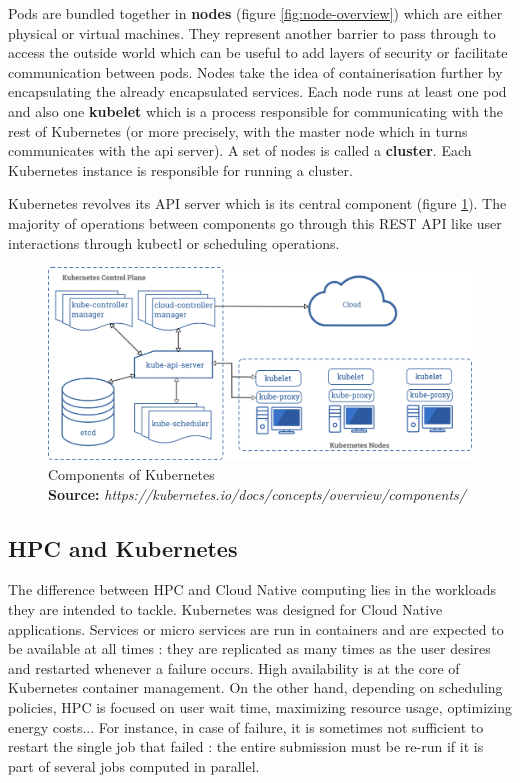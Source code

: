 \documentclass[12pt, a4paper]{memoir}
\newcommand*{\captionsource}[2]{%
    \caption[{#1}]{%
        #1%
        \\\hspace{\linewidth}%
	\textbf{Source:} \textit{#2}%
    }%
}
\begin{document}
Pods are bundled together in \textbf{nodes} (figure \ref{fig:node-overview})
which are either physical or virtual machines. They represent another barrier
to pass through to access the outside world which can be useful to add layers
of security or facilitate communication between pods. Nodes take the idea of
containerisation further by encapsulating the already encapsulated services.
Each node runs at least one pod and also one \textbf{kubelet} which is a
process responsible for communicating with the rest of Kubernetes (or more
precisely, with the master node which in turns communicates with the api
server). A set of nodes is called a \textbf{cluster}. Each Kubernetes instance
is responsible for running a cluster.

Kubernetes revolves its API server which is its central component (figure
\ref{fig:kube-components}). The majority of operations between components go
through this REST API like user interactions through kubectl or scheduling
operations.

\begin{figure}[h]
	\centering
	\includegraphics[width=\textwidth]{./imgs/components-of-kubernetes.png}
	\captionsource{Components of Kubernetes}{https://kubernetes.io/docs/concepts/overview/components/}
	\label{fig:kube-components}
\end{figure}

\newpage %
\subsection*{HPC and Kubernetes}
The difference between HPC and Cloud Native computing lies in the workloads
they are intended to tackle.  Kubernetes was designed for Cloud Native
applications. Services or micro services are run in containers and are expected
to be available at all times : they are replicated as many times as the user
desires and restarted whenever a failure occurs. High availability is at the
core of Kubernetes container management.  On the other hand, depending on
scheduling policies, HPC is focused on user wait time, maximizing resource
usage, optimizing energy costs... For instance, in case of failure, it is
sometimes not sufficient to restart the single job that failed : the entire
submission must be re-run if it is part of several jobs computed in parallel.
\end{document}

